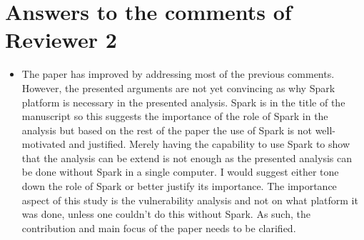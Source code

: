 \section{Answers to the comments of Reviewer 2}
%
%


\begin{itemize}
\item The paper has improved by addressing most of the previous comments. However, the presented arguments are not yet convincing as why Spark platform is necessary in the presented analysis. Spark is in the title of the manuscript so this suggests the importance of the role of Spark in the analysis but based on the rest of the paper the use of Spark is not well-motivated and justified. Merely having the capability to use Spark to show that the analysis can be extend is not enough as the presented analysis can be done without Spark in a single computer. I would suggest either tone down the role of Spark or better justify its importance. The importance aspect of this study is the vulnerability analysis and not on what platform it was done, unless one couldn't do this without Spark. As such, the contribution and main focus of the paper needs to be clarified.

~

\end{itemize}



